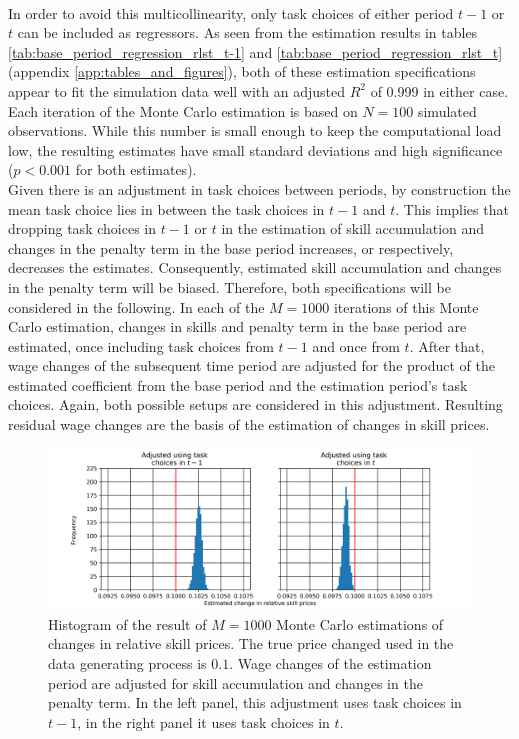 \documentclass[../main.tex]{subfiles}
\begin{document}
\\
In order to avoid this multicollinearity, only task choices of either period $t-1$ or $t$ can be included as regressors. As seen from the estimation results in tables \ref{tab:base_period_regression_rlst_t-1} and \ref{tab:base_period_regression_rlst_t} (appendix \ref{app:tables_and_figures}), both of these estimation specifications appear to fit the simulation data well with an adjusted $R^2$ of 0.999 in either case. Each iteration of the Monte Carlo estimation is based on $N=100$ simulated observations. While this number is small enough to keep the computational load low, the resulting estimates have small standard deviations and high significance ($p<0.001$ for both estimates).
\\
Given there is an adjustment in task choices between periods, by construction the mean task choice lies in between the task choices in $t-1$ and $t$. This implies that dropping task choices in $t-1$ or $t$ in the estimation of skill accumulation and changes in the penalty term in the base period increases, or respectively, decreases the estimates. Consequently, estimated skill accumulation and changes in the penalty term will be biased. Therefore, both specifications will be considered in the following. In each of the $M=1000$ iterations of this Monte Carlo estimation, changes in skills and penalty term in the base period are estimated, once including task choices from $t-1$ and once from $t$. After that, wage changes of the subsequent time period are adjusted for the product of the estimated coefficient from the base period and the estimation period's task choices. Again, both possible setups are considered in this adjustment. Resulting residual wage changes are the basis of the estimation of changes in skill prices. 
\\
\begin{figure}[!htbp]
	\centering
	\includegraphics[scale=0.7]{../FIG/MC_estimation_rslt.png} 
	\caption{Histogram of the result of $M=1000$ Monte Carlo estimations of changes in relative skill prices. The true price changed used in the data generating process is $0.1$. Wage changes of the estimation period are adjusted for skill accumulation and changes in the penalty term. In the left panel, this adjustment uses task choices in $t-1$, in the right panel it uses task choices in $t$.}
	\label{fig:MC_est_rslt}
\end{figure}
\end{document}
